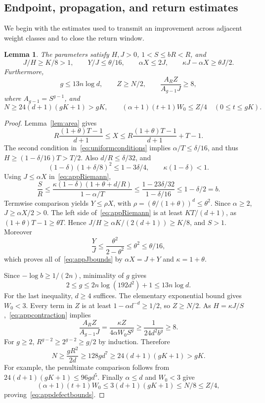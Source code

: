 \documentclass[11pt]{article}
\newtheorem{lemma}[theorem]{Lemma}
\theoremstyle{definition}
\begin{document}
\subsection{Endpoint, propagation, and return estimates}
We begin with the estimates used to transmit an improvement across adjacent weight classes and to close the return window.
\begin{lemma}\label{lem:appestimates}
The parameters satisfy $H,J>0$, $1<S\le bR<R$, and
\begin{equation}\label{eq:appJbounds}
 J/H\ge K/8>1,\qquad
 Y/J\le\theta/16,\qquad \alpha X\le2J,\qquad
 \kappa J-\alpha X\ge\theta J/2.
\end{equation}
Furthermore,
\begin{equation}\label{eq:appreturnbounds}
 g\le13n\log d,\qquad Z\ge N/2,\qquad
 \frac{A_RZ}{A_{g-1}J}\ge8,
\end{equation}
where $A_{g-1}=S^{g-1}$, and
\begin{equation}\label{eq:appdefectbounds}
 N\ge24(d+1)(gK+1)>gK,\qquad
 (\alpha+1)(t+1)W_0\le Z/4\quad(0\le t\le gK).
\end{equation}
\end{lemma}
\begin{proof}
Lemma~\ref{lem:area} gives
\begin{equation}\label{eq:appRiemann}
 R\frac{(1+\theta)T-1}{d+1}
 \le X\le R\frac{(1+\theta)T-1}{d+1}+T-1.
\end{equation}
The second condition in~\eqref{eq:uniformconditions} implies $\alpha/T\le\delta/16$, and thus $H\ge(1-\delta/16)T>T/2$. Also $d/R\le\delta/32$, and
\[
 (1-\delta)(1+\delta/8)^2\le1-3\delta/4,
 \qquad\kappa(1-\delta)<1.
\]
Using $J\le\alpha X$ in~\eqref{eq:appRiemann},
\begin{equation}\label{eq:appcontraction}
 \frac SR\le
 \frac{\kappa(1-\delta)(1+\theta+d/R)}{1-\alpha/T}
 \le\frac{1-23\delta/32}{1-\delta/16}
 \le1-\delta/2=b.
\end{equation}
Termwise comparison yields $Y\le\rho X$, with $\rho=(\theta/(1+\theta))^d\le\theta^2$. Since $\alpha\ge2$, $J\ge\alpha X/2>0$. The left side of~\eqref{eq:appRiemann} is at least $KT/(d+1)$, as $(1+\theta)T-1\ge\theta T$. Hence $J/H\ge\alpha K/(2(d+1))\ge K/8$, and $S>1$. Moreover
\[
 \frac YJ\le\frac{\theta^2}{2-\theta^2}\le\theta^2\le\theta/16,
\]
which proves all of~\eqref{eq:appJbounds} by $\alpha X=J+Y$ and $\kappa=1+\theta$.

Since $-\log b\ge1/(2n)$, minimality of $g$ gives
\[
 2\le g\le2n\log(192d^2)+1\le13n\log d.
\]
For the last inequality, $d\ge4$ suffices. The elementary exponential bound gives $W_0<3$. Every term in $Z$ is at least $1-\alpha d^{-d}\ge1/2$, so $Z\ge N/2$. As $H=\kappa J/S$,~\eqref{eq:appcontraction} implies
\[
 \frac{A_RZ}{A_{g-1}J}
 =\frac{\kappa Z}{4\alpha W_0S^g}
 \ge\frac1{24d^2b^g}\ge8.
\]
For $g\ge2$, $R^{g-2}\ge2^{g-2}\ge g/2$ by induction. Therefore
\[
 N\ge\frac{gR^2}{2d}\ge128gd^7
 \ge24(d+1)(gK+1)>gK.
\]
For example, the penultimate comparison follows from
$24(d+1)(gK+1)\le96gd^5$. Finally $\alpha\le d$ and $W_0<3$ give
\[
 (\alpha+1)(t+1)W_0\le3(d+1)(gK+1)\le N/8\le Z/4,
\]
proving~\eqref{eq:appdefectbounds}.
\end{proof}
\end{document}
